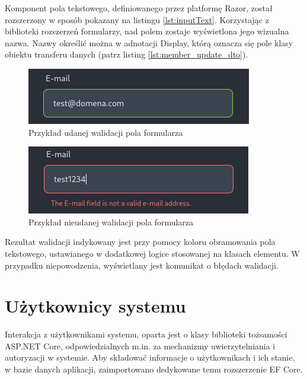 Komponent pola tekstowego, definiowanego przez platformę Razor, został rozszerzony w sposób pokazany na listingu \ref{lst:inputText}. Korzystając z biblioteki rozszerzeń formularzy, nad polem zostaje wyświetlona jego wizualna nazwa. Nazwy określić można w adnotacji Display, którą oznacza się pole klasy obiektu transferu danych (patrz listing \ref{lst:member_update_dto}).

\begin{figure}[!htbp]
\centering
\includegraphics[width=\textwidth]{img/chapter5/form_valid.png}
\caption{Przykład udanej walidacji pola formularza}
\end{figure}

\begin{figure}[!htbp]
\centering
\includegraphics[width=\textwidth]{img/chapter5/form_invalid.png}
\caption{Przykład nieudanej walidacji pola formularza}
\end{figure}

Rezultat walidacji indykowany jest przy pomocy koloru obramowania pola tekstowego, ustawianego w dodatkowej logice stosowanej na klasach elementu. W przypadku niepowodzenia, wyświetlany jest komunikat o błędach walidacji.

\section{Użytkownicy systemu}

Interakcja z użytkownikami systemu, oparta jest o klasy biblioteki tożsamości ASP.NET Core, odpowiedzialnych m.in. za mechanizmy uwierzytelniania i autoryzacji w systemie. Aby składować informacje o użytkownikach i ich stanie, w bazie danych aplikacji, zaimportowano dedykowane temu rozszerzenie EF Core.

